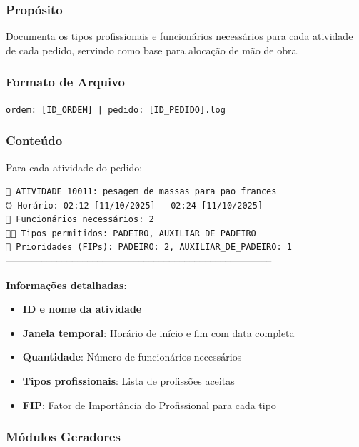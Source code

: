 \documentclass[11pt,a4paper]{article}
\begin{document}
\subsubsection{Propósito}

Documenta os tipos profissionais e funcionários necessários para cada atividade de cada pedido, servindo como base para alocação de mão de obra.

\subsubsection{Formato de Arquivo}

\texttt{ordem: [ID\_ORDEM] | pedido: [ID\_PEDIDO].log}

\subsubsection{Conteúdo}

Para cada atividade do pedido:

\begin{tcolorbox}[colback=codebg,colframe=loggreen,title=Formato de Requisito]
\begin{verbatim}
🔸 ATIVIDADE 10011: pesagem_de_massas_para_pao_frances
⏰ Horário: 02:12 [11/10/2025] - 02:24 [11/10/2025]
👥 Funcionários necessários: 2
👨‍💼 Tipos permitidos: PADEIRO, AUXILIAR_DE_PADEIRO
🎯 Prioridades (FIPs): PADEIRO: 2, AUXILIAR_DE_PADEIRO: 1
────────────────────────────────────────────────────
\end{verbatim}
\end{tcolorbox}

\textbf{Informações detalhadas}:
\begin{itemize}[leftmargin=2cm]
    \item \textbf{ID e nome da atividade}
    \item \textbf{Janela temporal}: Horário de início e fim com data completa
    \item \textbf{Quantidade}: Número de funcionários necessários
    \item \textbf{Tipos profissionais}: Lista de profissões aceitas
    \item \textbf{FIP}: Fator de Importância do Profissional para cada tipo
\end{itemize}

\subsubsection{Módulos Geradores}
\end{document}

